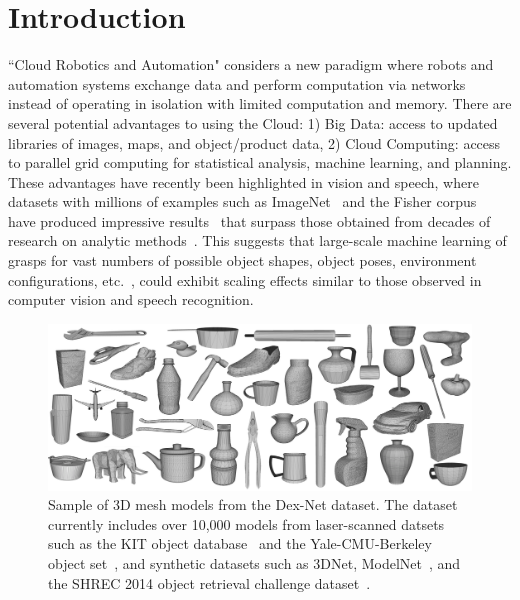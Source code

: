 \section{Introduction}

``Cloud Robotics and Automation" considers a new paradigm where robots and automation systems exchange data and perform computation via networks instead of operating in isolation with limited computation and memory.
There are several potential advantages to using the Cloud: 1) Big Data: access to updated libraries of images, maps, and object/product data, 2) Cloud Computing: access to parallel grid computing for statistical analysis, machine learning, and planning.
These advantages have recently been highlighted in vision and speech, where datasets with millions of examples such as ImageNet~\cite{deng2009imagenet} and the Fisher corpus~\cite{cieri2004fisher} have produced impressive results~\cite{hannun2014deepspeech, hays2008im2gps, krizhevsky2012imagenet} that surpass those obtained from decades of research on analytic methods~\cite{kehoe2015survey}.
This suggests that large-scale machine learning of grasps for vast numbers of possible object shapes, object poses, environment configurations, etc.~\cite{goldfeder2011data, lenz2015deep, kappler2015leveraging}, could exhibit scaling effects similar to those observed in computer vision and speech recognition.

\begin{figure}[t!]
\centering
\includegraphics[scale=0.085]{figures/dexnet_collage.jpg}
\caption{Sample of 3D mesh models from the Dex-Net dataset. The dataset currently includes over 10,000 models from laser-scanned datsets such as the KIT object database~\cite{kasper2012kit} and the Yale-CMU-Berkeley object set~\cite{calli2015benchmarking}, and synthetic datasets such as 3DNet\cite{wohlkinger20123dnet}, ModelNet~\cite{wu20143d}, and the SHREC 2014 object retrieval challenge dataset~\cite{li2015comparison}. }
\vspace*{-15pt}
\end{figure}

